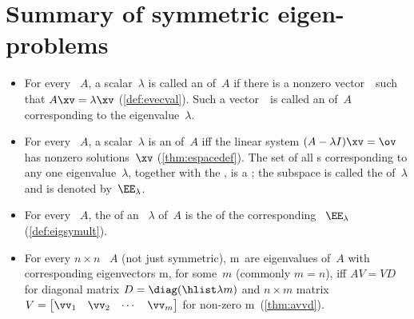 

\section{Summary of symmetric eigen-problems}
\label{sec:sumevs}


\begin{itemize}
\def\index#1{}%

\subsubsection{Introduction to eigenvalues and eigenvectors}

\item For every ~\(A\),  
a scalar~\(\lambda\) is called an  of~\(A\) if 
there is a nonzero vector~\xv\ such that \(A\xv=\lambda\xv\) (\autoref{def:evecval}). 
Such a vector~\xv\ is called an  of~\(A\) corresponding to the eigenvalue~\(\lambda\).   

\item For every ~\(A\), 
a scalar~\(\lambda\) is an  of~\(A\) iff the  linear system \((A-\lambda I)\xv=\ov\) has nonzero solutions~\(\xv\) (\autoref{thm:espacedef}).  
The set of all s corresponding to any one eigenvalue~\(\lambda\), together with the , is a ; the subspace is called the  of~\(\lambda\) and is denoted by~\(\EE_\lambda\).

\item For every ~\(A\), the  of an ~\(\lambda\) of~\(A\) is the  of the corresponding ~\(\EE_\lambda\) (\autoref{def:eigsymult}).

\item For every \(n\times n\) ~\(A\) (not just symmetric),
\hlist\lambda m\ are eigenvalues of~\(A\) with corresponding eigenvectors \hlist\vv m, for some~\(m\) (commonly \(m=n\)), iff \(AV=VD\) for diagonal matrix \(D=\diag(\hlist\lambda m)\) and \(n\times m\) matrix \(V=\begin{bmatrix} \vv_1&\vv_2&\cdots&\vv_m \end{bmatrix}\) for non-zero \hlist\vv m\ (\autoref{thm:avvd}).


\end{itemize}
